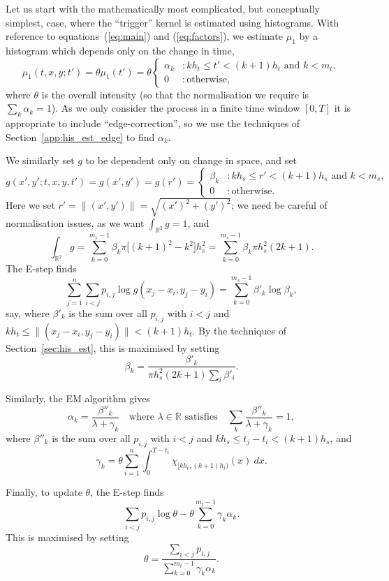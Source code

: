 \documentclass[twoside,a4paper]{article}
\theoremstyle{plain}
\theoremstyle{definition}
\begin{document}
Let us start with the mathematically most complicated, but conceptually simplest,
case, where the ``trigger'' kernel is estimated using histograms.  With reference
to equations~(\ref{eq:main}) and (\ref{eq:factors}), we estimate $\mu_1$ by a
histogram which depends only on the change in time,
\[ \mu_1(t,x,y;t') = \theta \mu_1(t') = \theta \begin{cases}
\alpha_k &: kh_t \leq t' < (k+1)h_t \text{ and } k < m_t, \\
0 &: \text{otherwise},
\end{cases} \]
where $\theta$ is the overall intensity (so that the normalisation we require
is $\sum_k \alpha_k=1$).  As we only consider the process in a finite time window
$[0,T]$ it is appropriate to include ``edge-correction'', so we use the techniques
of Section~\ref{app:his_est_edge} to find $\alpha_k$.

We similarly set $g$ to be dependent only on change in space, and set
\[ g(x',y';t,x,y,t') = g(x',y') = g(r') = 
\begin{cases}
\beta_k &: kh_s \leq r' < (k+1)h_s \text{ and } k < m_s, \\
0 &: \text{otherwise}.
\end{cases} \]
Here we set $r' = \|(x',y')\| = \sqrt{(x')^2 + (y')^2}$;
we need be careful of normalisation
issues, as we want $\int_{\mathbb R^2} g = 1$, and
\[ \int_{\mathbb R^2} g = \sum_{k=0}^{m_s-1} \beta_k \pi\big[
(k+1)^2 - k^2 \big] h_s^2
= \sum_{k=0}^{m_s-1} \beta_k \pi h_s^2 (2k+1). \]
The E-step finds
\[ \sum_{j=1}^n \sum_{i<j} p_{i,j} \log g(x_j-x_i, y_j-y_i)
= \sum_{k=0}^{m_s-1} \beta'_k \log \beta_k, \]
say, where $\beta'_k$ is the sum over all $p_{i,j}$ with $i<j$ and
$kh_t \leq \|(x_j-x_i, y_j-y_i)\| < (k+1)h_t$.
By the techniques of Section~\ref{sec:his_est}, this is maximised by setting
\[ \beta_k = \frac{\beta'_k}{\pi h_s^2 (2k+1) \sum_i \beta'_i}. \]

Similarly, the EM algorithm gives
\[ \alpha_k = \frac{\beta''_k}{\lambda + \gamma_k}
\quad\text{where $\lambda\in\mathbb R$ satisfies}\quad \sum_k \frac{\beta''_k}{\lambda + \gamma_k} = 1, \]
where $\beta''_k$ is the sum over all $p_{i,j}$ with $i<j$ and
$kh_s \leq t_j-t_i < (k+1)h_s$, and 
\[ \gamma_k = \theta \sum_{i=1}^n \int_0^{T-t_i}
\chi_{[kh_t,(k+1)h_t)}(x) \ dx. \]

Finally, to update $\theta$, the E-step finds
\[ \sum_{i<j} p_{i,j} \log\theta - \theta\sum_{k=0}^{m_t-1} \gamma_k \alpha_k. \]
This is maximised by setting
\[ \theta = \frac{\sum_{i<j} p_{i,j}}{\sum_{k=0}^{m_t-1} \gamma_k \alpha_k}. \]
\end{document}
